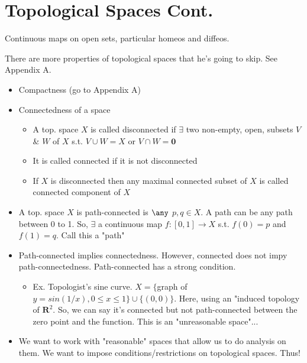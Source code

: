 \documentclass[12pt,letterpaper]{article}
\begin{document}
\section*{Topological Spaces Cont.}
Continuous maps on open sets, particular homeos and diffeos.


There are more properties of topological spaces that he's going to skip. See Appendix A. 
\begin{itemize}
  \item Compactness (go to Appendix A)
  \item Connectedness of a space
  \begin{itemize}
    \item A top. space $X$ is called disconnected if $\exists$ two non-empty, open, subsets $V$ & $W$ of $X$ s.t. $V \cup W = X$ or $V \cap W = \mathbf{0}$
    \item It is called connected if it is not disconnected
    \item If $X$ is disconnected then any maximal connected subset of $X$ is called connected component of $X$
  \end{itemize}
  \item A top. space $X$ is path-connected is $\any$ $p,q \in X$. A  path can be any path between 0 to 1. So, $\exists$ a continuous map $f: [0,1] \rightarrow X$ s.t. $f(0)=p$ and $f(1)=q$. Call this a "path"
  \item Path-connected implies connectedness. However, connected does not impy path-connectedness. Path-connected has a strong condition.
  \begin{itemize}
      \item Ex. Topologist's sine curve. $X = \{$graph of $y=sin(1/x), 0 \leq x \leq 1\} \cup \{(0,0)\}$. Here, using an "induced topology of $\mathbf{R}^2$. So, we can say it's connected but not path-connected between the zero point and the function. This is an "unreasonable space"...
  \end{itemize}
  \item We want to work with "reasonable" spaces that allow us to do analysis on them. We want to impose conditions/restrictions on topological spaces. Thus!
\end{itemize}
\end{document}
